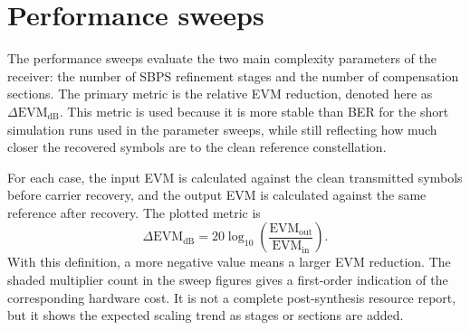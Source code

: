 \section{Performance sweeps}\label{sec:results-performance-sweeps}

The performance sweeps evaluate the two main complexity parameters of the receiver: the number of \ac{SBPS} refinement stages and the number of compensation sections. The primary metric is the relative \ac{EVM} reduction, denoted here as $\Delta\mathrm{EVM}_{\mathrm{dB}}$. This metric is used because it is more stable than \ac{BER} for the short simulation runs used in the parameter sweeps, while still reflecting how much closer the recovered symbols are to the clean reference constellation.

For each case, the input \ac{EVM} is calculated against the clean transmitted symbols before carrier recovery, and the output \ac{EVM} is calculated against the same reference after recovery. The plotted metric is
\begin{equation}
    \Delta\mathrm{EVM}_{\mathrm{dB}}
    =
    20\log_{10}
    \left(
    \frac{\mathrm{EVM}_{\mathrm{out}}}{\mathrm{EVM}_{\mathrm{in}}}
    \right).
    \label{eq:delta-evm}
\end{equation}
With this definition, a more negative value means a larger \ac{EVM} reduction. The shaded multiplier count in the sweep figures gives a first-order indication of the corresponding hardware cost. It is not a complete post-synthesis resource report, but it shows the expected scaling trend as stages or sections are added.




